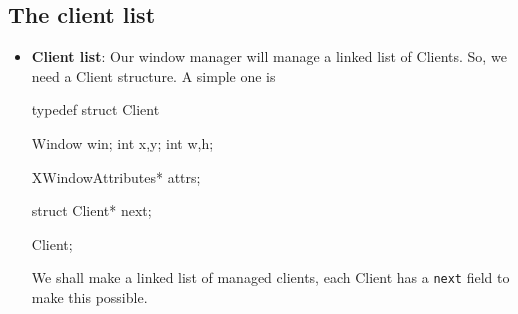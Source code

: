 \documentclass{report}
\begin{document}
    \subsection{The client list}
    \begin{itemize}
        \item \textbf{Client list}: Our window manager will manage a linked list of Clients. So, we need a Client structure. A simple one is 
            \bigbreak \noindent 
            \begin{cppcode}
                typedef struct Client {
                    Window win;
                    int x,y;
                    int w,h;

                    XWindowAttributes* attrs;

                    struct Client* next;
                } Client;
            \end{cppcode}
            \bigbreak \noindent 
            We shall make a linked list of managed clients, each Client has a \texttt{next} field to make this possible.
    \end{itemize}

    \pagebreak 
\end{document}
